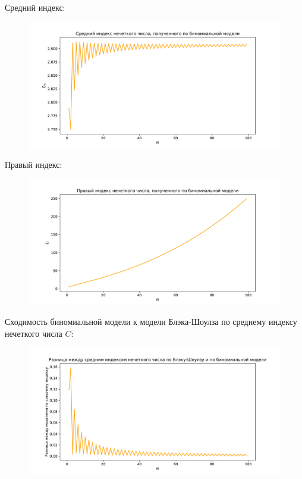 \documentclass[a4paper,12pt]{extarticle} %
\begin{document}
	Средний индекс:
	\begin{figure}[H]
		\centering
		\includegraphics[width=\textwidth]{_images/middle-fuzzy-binomial.pdf}
	\end{figure}
	
	Правый индекс:
	\begin{figure}[H]
		\centering
		\includegraphics[width=\textwidth]{_images/right-fuzzy-binomial.pdf}
	\end{figure}
	
	Сходимость биномиальной модели к модели Блэка-Шоулза по среднему индексу нечеткого числа $C$:
	\begin{figure}[H]
		\centering
		\includegraphics[width=\textwidth]{_images/middle-fuzzy-binomial-to-middle-fuzzy-black-scholes.pdf}
	\end{figure}
	
\end{document}
